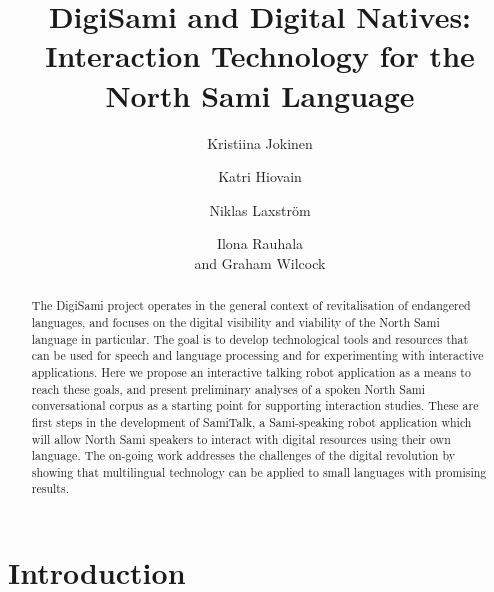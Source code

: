 \documentclass[runningheads,a4paper]{llncs}
\begin{document}
\mainmatter  %

\title{DigiSami and Digital Natives: Interaction Technology for the North Sami Language}

\author{Kristiina Jokinen \and Katri Hiovain \and Niklas Laxstr\"{o}m
        \and Ilona Rauhala \\ and Graham Wilcock}



\maketitle

\begin{abstract}
The DigiSami project operates in the general context of revitalisation of endangered languages, and focuses on the digital visibility and viability of the North Sami language in particular. The goal is to develop technological tools and resources that can be used for speech and language processing and for experimenting with interactive applications. Here we propose an interactive talking robot application as a means to reach these goals, and present preliminary analyses of a spoken North Sami conversational corpus as a starting point for supporting interaction studies. These are first steps in the development of SamiTalk, a Sami-speaking robot application which will allow North Sami speakers to interact with digital resources using their own language. The on-going work addresses the challenges of the digital revolution by showing that multilingual technology can be applied to small languages with promising results.
\end{abstract}


\section{Introduction}
\label{sec:introduction}
\end{document}
